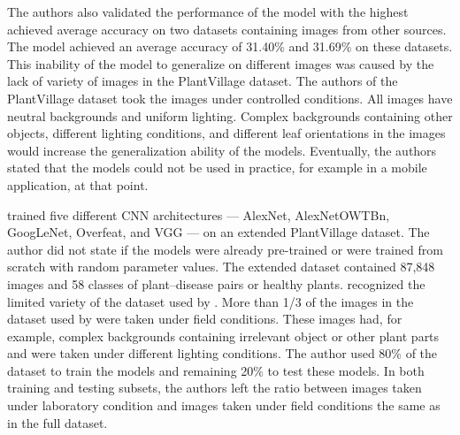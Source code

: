 \documentclass{BachelorBUI}
\begin{document}
        The authors also validated the performance of the model with the highest achieved average accuracy on two datasets containing images from other sources. The model achieved an average accuracy of 31.40\% and 31.69\% on these datasets. This inability of the model to generalize on different images was caused by the lack of variety of images in the PlantVillage dataset. The authors of the PlantVillage dataset took the images under controlled conditions. All images have neutral backgrounds and uniform lighting. Complex backgrounds containing other objects, different lighting conditions, and different leaf orientations in the images would increase the generalization ability of the models. Eventually, the authors stated that the models could not be used in practice, for example in a mobile application, at that point. 

        \textcite{Ferentinos:2018} trained five different CNN architectures --- AlexNet, AlexNetOWTBn, GoogLeNet, Overfeat, and VGG --- on an extended PlantVillage dataset. The author did not state if the models were already pre-trained or were trained from scratch with random parameter values. The extended dataset contained 87,848 images and 58 classes of plant--disease pairs or healthy plants. \textcite{Ferentinos:2018} recognized the limited variety of the dataset used by \textcite{Mohanty:2016}. More than 1/3 of the images in the dataset used by \textcite{Ferentinos:2018} were taken under field conditions. These images had, for example, complex backgrounds containing irrelevant object or other plant parts and were taken under different lighting conditions. The author used 80\% of the dataset to train the models and remaining 20\% to test these models. In both training and testing subsets, the authors left the ratio between images taken under laboratory condition and images taken under field conditions the same as in the full dataset. 
\end{document}
